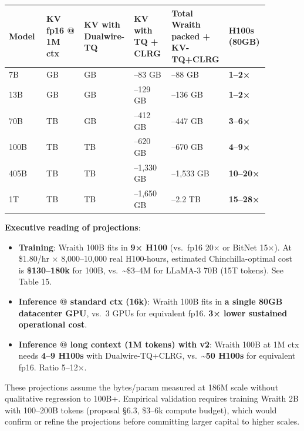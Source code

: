 {\def\LTcaptype{none} %
{\footnotesize\setlength{\tabcolsep}{3pt}
\begin{longtable}[]{@{}>{\raggedright\arraybackslash}p{0.147\linewidth}>{\raggedright\arraybackslash}p{0.147\linewidth}>{\raggedright\arraybackslash}p{0.147\linewidth}>{\raggedright\arraybackslash}p{0.147\linewidth}>{\raggedright\arraybackslash}p{0.147\linewidth}>{\raggedright\arraybackslash}p{0.147\linewidth}@{}}
\toprule\noalign{}
Model & KV fp16 @ 1M ctx & KV with Dualwire-TQ & KV with TQ + CLRG & Total Wraith packed + KV-TQ+CLRG & H100s (80GB) \\
\midrule\noalign{}
\endhead
\bottomrule\noalign{}
\endlastfoot
7B & 550 GB & 138 GB & 35--83 GB & 40--88 GB & \textbf{1--2×} \\
13B & 859 GB & 215 GB & 54--129 GB & 61--136 GB & \textbf{1--2×} \\
70B & 2.7 TB & 687 GB & 172--412 GB & 207--447 GB & \textbf{3--6×} \\
100B & 4.1 TB & 1.0 TB & 258--620 GB & 308--670 GB & \textbf{4--9×} \\
405B & 8.7 TB & 2.2 TB & 554--1,330 GB & 757--1,533 GB &
\textbf{10--20×} \\
1T & 11.0 TB & 2.7 TB & 688--1,650 GB & 1.2--2.2 TB &
\textbf{15--28×} \\
\end{longtable}
}
}

\textbf{Executive reading of projections}:

\begin{itemize}
\tightlist
\item
  \textbf{Training}: Wraith 100B fits in \textbf{9× H100} (vs.~fp16 20×
  or BitNet 15×). At \$1.80/hr × 8,000--10,000 real H100-hours,
  estimated Chinchilla-optimal cost is \textbf{\$130--180k} for 100B,
  vs.~\textasciitilde\$3--4M for LLaMA-3 70B (15T tokens). See Table 15.
\item
  \textbf{Inference @ standard ctx (16k)}: Wraith 100B fits in \textbf{a
  single 80GB datacenter GPU}, vs.~3 GPUs for equivalent fp16.
  \textbf{3× lower sustained operational cost}.
\item
  \textbf{Inference @ long context (1M tokens) with v2}: Wraith 100B at
  1M ctx needs \textbf{4--9 H100s} with Dualwire-TQ+CLRG,
  vs.~\textbf{\textasciitilde50 H100s} for equivalent fp16. Ratio
  5--12×.
\end{itemize}

These projections assume the bytes/param measured at 186M scale without
qualitative regression to 100B+. Empirical validation requires training
Wraith 2B with 100--200B tokens (proposal §6.3, \$3--6k compute budget),
which would confirm or refine the projections before committing larger
capital to higher scales.

